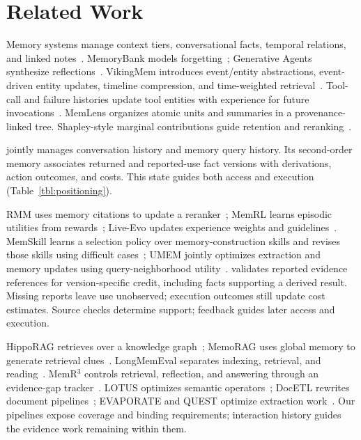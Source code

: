 \section{Related Work}
\label{sec:related}

Memory systems manage context tiers, conversational facts, temporal
relations, and linked notes~\cite{memgpt,mem0,zep,agenticmem}.
MemoryBank models forgetting~\cite{memorybank}; Generative Agents
synthesize reflections~\cite{generativeagents}.
VikingMem introduces event/entity abstractions, event-driven entity
updates, timeline compression, and time-weighted
retrieval~\cite{vikingmem}. Tool-call and failure
histories update tool entities with experience for future
invocations~\cite{vikingmem}.
MemLens organizes atomic units and summaries in a provenance-linked
tree. Shapley-style marginal contributions guide retention and
reranking~\cite{memlens}.

\sys{} jointly manages conversation history and memory query history.
Its second-order memory associates returned and reported-use fact
versions with derivations, action outcomes, and costs. This state guides
both access and execution (Table~\ref{tbl:positioning}).

RMM uses memory citations to update a reranker~\cite{rmm}; MemRL
learns episodic utilities from rewards~\cite{memrl}; Live-Evo updates
experience weights and guidelines~\cite{liveevo}. MemSkill learns a
selection policy over memory-construction skills and revises those
skills using difficult cases~\cite{memskill}; UMEM jointly optimizes
extraction and memory updates using query-neighborhood utility~\cite{umem}.
\sys{} validates reported evidence references for version-specific credit,
including facts supporting a derived result. Missing reports leave use
unobserved; execution outcomes still update cost estimates. Source
checks determine support; feedback guides later access and execution.

HippoRAG retrieves over a knowledge graph~\cite{hipporag}; MemoRAG uses
global memory to generate retrieval clues~\cite{memorag}.
LongMemEval separates indexing, retrieval, and
reading~\cite{longmemeval}. MemR$^3$ controls retrieval, reflection, and
answering through an evidence-gap tracker~\cite{memr3}.
LOTUS optimizes semantic operators~\cite{lotus}; DocETL rewrites
document pipelines~\cite{docetl}; EVAPORATE and QUEST optimize
extraction work~\cite{evaporate,quest}.
Our pipelines expose coverage and binding requirements; interaction
history guides the evidence work remaining within them.

